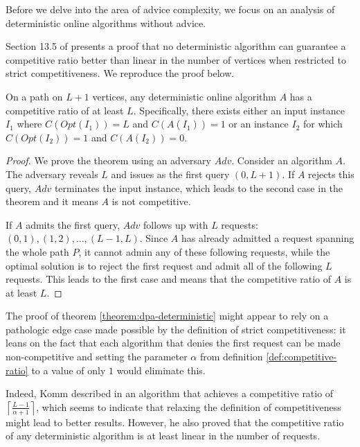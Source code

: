 Before we delve into the area of advice complexity, we focus on an
analysis of deterministic online algorithms without advice.

Section 13.5 of \cite{dpa-book} presents a proof that no deterministic
algorithm can guarantee a competitive ratio better than linear in the
number of vertices when restricted to strict competitiveness. We reproduce
the proof below.

\begin{theorem}\label{theorem:dpa-deterministic}
    On a path on $L+1$ vertices, any deterministic online algorithm $A$
    has a competitive ratio of at least $L$. Specifically, there exists
    either an input instance $I_1$ where $C(Opt(I_1)) = L$ and
    $C(A(I_1)) = 1$ or an instance $I_2$ for which $C(Opt(I_2)) = 1$ and
    $C(A(I_2)) = 0$.
\end{theorem}

\begin{proof}
    We prove the theorem using an adversary $Adv$. Consider an algorithm
    $A$. The adversary reveals $L$ and issues as the first query $(0, L+1)$.
    If $A$ rejects this query, $Adv$ terminates the input instance, which
    leads to the second case in the theorem and it means $A$ is not
    competitive.

    If $A$ admits the first query, $Adv$ follows up with $L$ requests:
    $(0, 1), (1, 2), \dots, (L - 1, L)$. Since $A$ has already admitted a
    request spanning the whole path $P$, it cannot admin any of these
    following requests, while the optimal solution is to reject the first
    request and admit all of the following $L$ requests. This leads
    to the first case and means that the competitive ratio of $A$ is at
    least $L$.
\end{proof}

The proof of theorem \ref{theorem:dpa-deterministic} might appear to rely
on a pathologic edge case made possible by the definition of strict
competitiveness: it leans on the fact that each algorithm that denies the
first request can be made non-competitive and setting the parameter
$\alpha$ from definition \ref{def:competitive-ratio} to a value of only
$1$ would eliminate this.

Indeed, Komm described in \cite{komm-thesis} an algorithm that achieves a
competitive ratio of $\left\lceil\frac{L-1}{\alpha+1}\right\rceil$, which
seems to indicate that relaxing the definition of competitiveness might
lead to better results. However, he also proved that the competitive ratio
of any deterministic algorithm is at least linear in the number of
requests.

